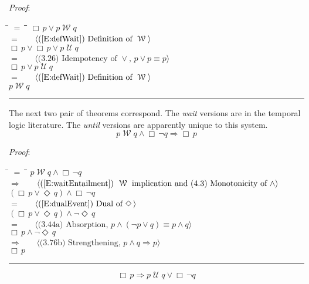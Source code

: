 \documentclass[12pt, fleqn, leqno]{article}
\newcommand{\lgap}{2pt}                             %
\newcommand{\mymathindent}{24pt}                    %
\newcommand{\impl}{\ensuremath{\Rightarrow}}        %
\newcommand{\Until}{\;\mathcal{U}\;}
\newcommand{\Wait}{\;\mathcal{W}\;}
\newcommand{\Event}{\Diamond\,}
\newcommand{\Always}{\Box\,}
\newcommand{\myqed}{\rule[-.23ex]{1.2ex}{2.0ex}}
\newcommand{\myqedtab}{\hspace{384pt}}              %
\newcommand{\Gll} {\langle}                         %
\newcommand{\Ggg} {\rangle}                         %
\newcommand{\Hint}[1]     {\ \ \ $\Gll              \mbox{#1} \Ggg$ }   %
\begin{document}
\emph{Proof}:
\begin{tabbing}
\hspace{\mymathindent} \= $= \;$ \= \myqedtab \= \kill
\> \> $\Always p\lor p\Wait q$\\[\lgap]
\> $=$ \> \Hint{(\ref{E:defWait}) Definition of $\Wait$} \\[\lgap]
\> \> $\Always p\lor \Always p\lor p\Until q$\\[\lgap]
\> $=$ \> \Hint{(3.26) Idempotency of $\lor$, $p \lor p \equiv p$} \\[\lgap]
\> \> $\Always p\lor p\Until q$\\[\lgap]
\> $=$ \> \Hint{(\ref{E:defWait}) Definition of $\Wait$} \\[\lgap]
\> \> $p\Wait q$ \quad \myqed
\end{tabbing}

The next two pair of theorems correspond.
The \textit{wait} versions are in the temporal logic literature.
The \textit{until} versions are apparently unique to this system.
\begin{equation}\label{E:waitEntailAlways}
p \Wait q \land \Always\neg q \impl \Always p
\end{equation}

\emph{Proof}:
\begin{tabbing}
\hspace{\mymathindent} \= $= \;$ \= \myqedtab \= \kill
\> \> $p \Wait q \land \Always\neg q$\\[\lgap]
\> $\impl$ \> \Hint{(\ref{E:waitEntailment}) $\Wait$ implication and (4.3) Monotonicity of $\land$} \\[\lgap]
\> \> $(\Always p \lor \Event q) \land \Always\neg q$\\[\lgap]
  \> $=$  \>  \Hint{(\ref{E:dualEvent}) Dual of $\Event$}\\[\lgap]
\> \> $(\Always p \lor \Event q) \land \neg \Event q$\\[\lgap]
\> $=$ \> \Hint{(3.44a) Absorption, $p\land (\neg p\lor q)\equiv p\land q$} \\[\lgap]
\> \> $\Always p \land \neg \Event q$\\[\lgap]
\> $\impl$ \> \Hint{(3.76b) Strengthening, $p\land q \impl p$} \\[\lgap]
\> \> $\Always p$ \quad \myqed
\end{tabbing}
\begin{equation}\label{E:untilEntailAlways}
\Always p\impl p \Until q \lor \Always\neg q 
\end{equation}
\end{document}
